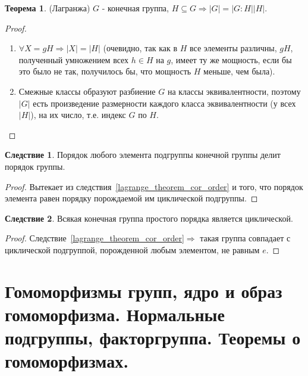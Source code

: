 \documentclass[11pt,a4paper]{report}
\renewcommand{\implies}{\Rightarrow}
\theoremstyle{definition}
\theoremstyle{definition}
\newtheorem{theorem}{Теорема}[section]
\newtheorem{corollary}{Следствие}[section]
\theoremstyle{definition}
\begin{document}
 	\begin{theorem}
 	\label{lagrange_theorem}(Лагранжа)
 	$G$ - конечная группа, $H\subseteq G\implies \left|G\right|=\left|G:H\right|\left|H\right|.$
 	\begin{proof}
 	\begin{enumerate}
 	\item{$\forall X=gH\implies\left|X\right|=\left|H\right|$ (очевидно, так как в $H$ все элементы различны, $gH$, полученный умножением всех $h\in H$ на $g$, имеет ту же мощность, если бы это было не так, получилось бы, что мощность $H$ меньше, чем была).}
 	\item{Смежные классы образуют разбиение $G$ на классы эквивалентности, поэтому $\left|G\right|$ есть произведение размерности каждого класса эквивалентности (у всех $|H|$), на их число, т.е. индекс $G$ по $H$.}
 	\end{enumerate}
 	\end{proof}
 	\end{theorem}
 	\begin{corollary}\label{lagrange_theorem_cor_order_element}
		Порядок любого элемента подгруппы конечной группы делит порядок группы. 	
		\begin{proof}
		Вытекает из следствия~\ref{lagrange_theorem_cor_order} и того, что порядок элемента равен порядку порождаемой им циклической подгруппы.
		\end{proof}
 	\end{corollary}
 	\begin{corollary}\label{lagrange_theorem_cor_simple}
		Всякая конечная группа простого порядка является циклической. 
		\begin{proof}
		Следствие~\ref{lagrange_theorem_cor_order}$\implies$ такая группа совпадает с циклической подгруппой, порожденной любым элементом, не равным $e$.
		\end{proof}			
 	\end{corollary}
 	
 	\newpage
 	\section{Гомоморфизмы групп, ядро и образ гомоморфизма. Нормальные подгруппы, факторгруппа. Теоремы о гомоморфизмах.}
 	
\end{document}
